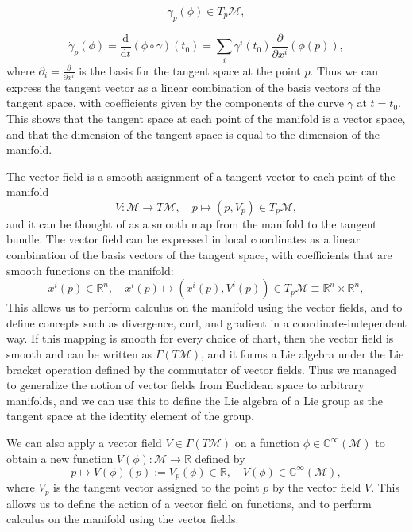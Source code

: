 \[
    \dot{\gamma}_p(\phi) \in T_p \mathcal{M},
\]

\[
    \dot{\gamma}_p(\phi) = \frac{\mathrm{d}}{\mathrm{d} t} (\phi \circ \gamma) (t_0) = \sum_{i} \gamma^i(t_0) \frac{\partial}{\partial x^i} (\phi(p)),
\]
where \(\partial_i = \frac{\partial}{\partial x^i}\) is the basis for the tangent space at the point \(p\). Thus we can express the tangent vector as a linear combination of the basis vectors of the tangent space, with coefficients given by the components of the curve \(\gamma\) at \(t=t_0\). This shows that the tangent space at each point of the manifold is a vector space, and that the dimension of the tangent space is equal to the dimension of the manifold.

The vector field is a smooth assignment of a tangent vector to each point of the manifold
\[
    V : \mathcal{M} \to T\mathcal{M}, \quad p \mapsto (p, V_p) \in T_p \mathcal{M},
\]
and it can be thought of as a smooth map from the manifold to the tangent bundle. The vector field can be expressed in local coordinates as a linear combination of the basis vectors of the tangent space, with coefficients that are smooth functions on the manifold:
\[
    x^i (p) \in \mathbb{R}^n, \quad x^i (p) \mapsto (x^i (p), V^i(p)) \in T_p \mathcal{M} \equiv \mathbb{R}^n \times \mathbb{R}^n,
\]
This allows us to perform calculus on the manifold using the vector fields, and to define concepts such as divergence, curl, and gradient in a coordinate-independent way. If this mapping is smooth for every choice of chart, then the vector field is smooth and can be written as \(\Gamma(T\mathcal{M})\), and it forms a Lie algebra under the Lie bracket operation defined by the commutator of vector fields. Thus we managed to generalize the notion of vector fields from Euclidean space to arbitrary manifolds, and we can use this to define the Lie algebra of a Lie group as the tangent space at the identity element of the group.

We can also apply a vector field \(V \in \Gamma(T\mathcal{M})\) on a function \(\phi \in \mathbb{C}^{\infty}(\mathcal{M})\) to obtain a new function \(V(\phi) : \mathcal{M} \to \mathbb{R}\) defined by
\[
    p \mapsto V(\phi)(p) := V_p(\phi) \in \mathbb{R}, \quad V(\phi) \in \mathbb{C}^{\infty}(\mathcal{M}),
\]
where \(V_p\) is the tangent vector assigned to the point \(p\) by the vector field \(V\). This allows us to define the action of a vector field on functions, and to perform calculus on the manifold using the vector fields.

